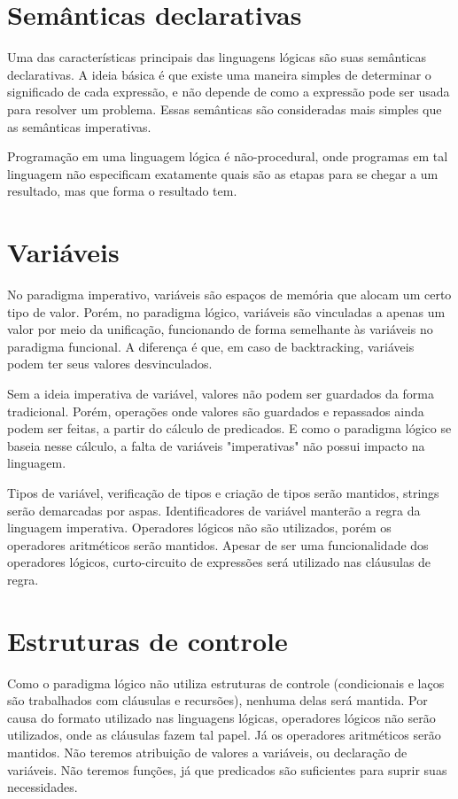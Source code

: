 \documentclass[12pt, a4paper]{article}
\begin{document}
\section{Semânticas declarativas}
Uma das características principais das linguagens lógicas são suas
semânticas declarativas. A ideia básica é que existe uma maneira
simples de determinar o significado de cada expressão, e não depende de
como a expressão pode ser usada para resolver um problema. Essas
semânticas são consideradas mais simples que as semânticas imperativas.

Programação em uma linguagem lógica é não-procedural, onde programas em
tal linguagem não especificam exatamente quais são as etapas para se
chegar a um resultado, mas que forma o resultado tem.

\section{Variáveis}
No paradigma imperativo, variáveis são espaços de memória que alocam um
certo tipo de valor. Porém, no paradigma lógico, variáveis são
vinculadas a apenas um valor por meio da unificação, funcionando de
forma semelhante às variáveis no paradigma funcional. A diferença é
que, em caso de backtracking, variáveis podem ter seus valores
desvinculados.

Sem a ideia imperativa de variável, valores não podem ser guardados da
forma tradicional. Porém, operações onde valores são guardados e
repassados ainda podem ser feitas, a partir do cálculo de predicados. E
como o paradigma lógico se baseia nesse cálculo, a falta de variáveis
"imperativas" não possui impacto na linguagem.

Tipos de variável, verificação de tipos e criação de tipos serão mantidos,
strings serão demarcadas por aspas.  Identificadores de variável manterão a
regra da linguagem imperativa.  Operadores lógicos não são utilizados, porém os
operadores aritméticos serão mantidos. Apesar de ser uma funcionalidade dos
operadores lógicos, curto-circuito de expressões será utilizado nas cláusulas
de regra.

\section{Estruturas de controle}
Como o paradigma lógico não utiliza estruturas de controle
(condicionais e laços são trabalhados com cláusulas e recursões),
nenhuma delas será mantida. Por causa do formato utilizado nas
linguagens lógicas, operadores lógicos não serão utilizados, onde as
cláusulas fazem tal papel. Já os operadores aritméticos serão mantidos.
Não teremos atribuição de valores a variáveis, ou declaração de
variáveis. Não teremos funções, já que predicados são suficientes para
suprir suas necessidades.
\end{document}
